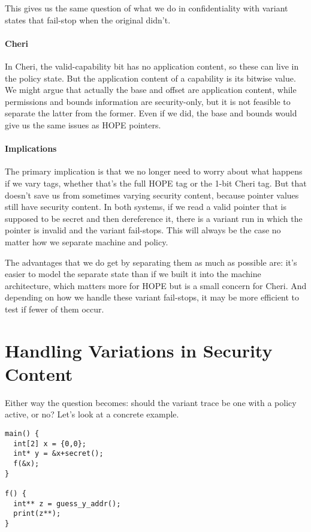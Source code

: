 \documentclass{article}
\begin{document}
This gives us the same question of what we do in confidentiality with variant states that fail-stop
when the original didn't.

\paragraph*{Cheri} In Cheri, the valid-capability bit has no application content, so these can live in
the policy state. But the application content of a capability is its bitwise value. We might argue
that actually the base and offset are application content, while permissions and bounds information
are security-only, but it is not feasible to separate the latter from the former. Even if we did, the
base and bounds would give us the same issues as HOPE pointers.

\paragraph*{Implications} The primary implication is that we no longer need to worry about what happens
if we vary tags, whether that's the full HOPE tag or the 1-bit Cheri tag. But that doesn't save us
from sometimes varying security content, because pointer values still have security content. In both systems,
if we read a valid pointer that is supposed to be secret and then dereference it, there is a variant run
in which the pointer is invalid and the variant fail-stops. This will always be the case no matter how we
separate machine and policy.

The advantages that we do get by separating them as much as possible are: it's easier to model the separate
state than if we built it into the machine architecture, which matters more for HOPE but is a small concern for
Cheri. And depending on how we handle these variant fail-stops, it may be more efficient to test if fewer of
them occur.

\section{Handling Variations in Security Content}

Either way the question becomes: should the variant trace be one with a policy active, or no? Let's
look at a concrete example.

\begin{verbatim}
main() {
  int[2] x = {0,0};
  int* y = &x+secret();
  f(&x);
}

f() {
  int** z = guess_y_addr();
  print(z**);
}
\end{verbatim}
\end{document}
